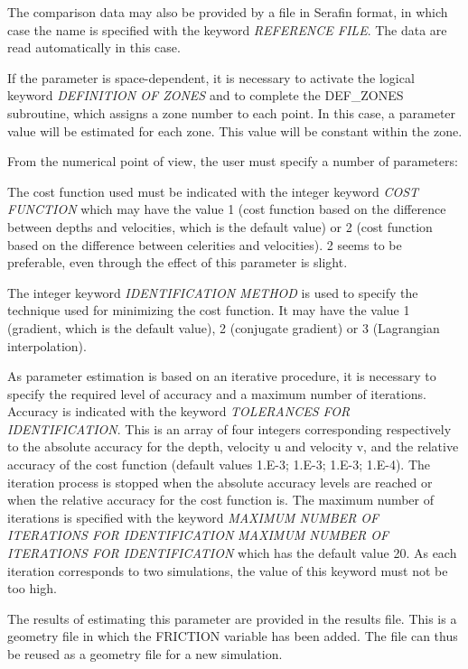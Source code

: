  The comparison data may also be provided by a file in Serafin format, in which case the name is specified with the keyword \textit{REFERENCE FILE}. The data are read automatically in this case.

 If the parameter is space-dependent, it is necessary to activate the logical keyword \textit{DEFINITION OF ZONES} and to complete the DEF\_ZONES subroutine, which assigns a zone number to each point. In this case, a parameter value will be estimated for each zone. This value will be constant within the zone.

 From the numerical point of view, the user must specify a number of parameters:

 The cost function used must be indicated with the integer keyword \textit{COST FUNCTION} which may have the value 1 (cost function based on the difference between depths and velocities, which is the default value) or 2 (cost function based on the difference between celerities and velocities). 2 seems to be preferable, even through the effect of this parameter is slight.

 The integer keyword \textit{IDENTIFICATION METHOD} is used to specify the technique used for minimizing the cost function. It may have the value 1 (gradient, which is the default value), 2 (conjugate gradient) or 3 (Lagrangian interpolation).

 As parameter estimation is based on an iterative procedure, it is necessary to specify the required level of accuracy and a maximum number of iterations. Accuracy is indicated with the keyword \textit{TOLERANCES FOR IDENTIFICATION}. This is an array of four integers corresponding respectively to the absolute accuracy for the depth, velocity u and velocity v, and the relative accuracy of the cost function (default values 1.E-3; 1.E-3; 1.E-3; 1.E-4). The iteration process is stopped when the absolute accuracy levels are reached or when the relative accuracy for the cost function is. The maximum number of iterations is specified with the keyword \textit{MAXIMUM NUMBER OF ITERATIONS FOR IDENTIFICATION} \textit{MAXIMUM NUMBER OF ITERATIONS FOR IDENTIFICATION} which has the default value 20. As each iteration corresponds to two simulations, the value of this keyword must not be too high.

 The results of estimating this parameter are provided in the results file. This is a geometry file in which the FRICTION variable has been added. The file can thus be reused as a geometry file for a new simulation.


